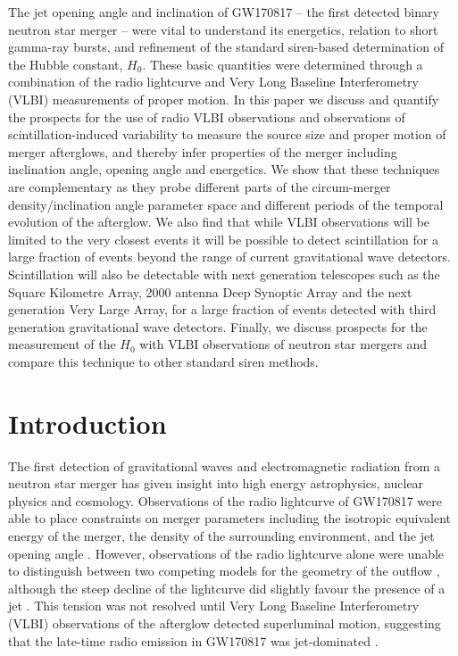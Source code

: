 \endgroup

The jet opening angle and inclination of GW170817 -- the first detected binary neutron star merger -- were vital to understand its energetics, relation to short gamma-ray bursts, and refinement of the standard siren-based determination of the Hubble constant, $H_0$. These basic quantities were determined through a combination of the radio lightcurve and Very Long Baseline Interferometry (VLBI) measurements of proper motion. In this paper we discuss and quantify the prospects for the use of radio VLBI observations and observations of scintillation-induced variability to measure the source size and proper motion of merger afterglows, and thereby infer properties of the merger including inclination angle, opening angle and energetics. We show that these techniques are complementary as they probe different parts of the circum-merger density/inclination angle parameter space and different periods of the temporal evolution of the afterglow. We also find that while VLBI observations will be limited to the very closest events it will be possible to detect scintillation for a large fraction of events beyond the range of current gravitational wave detectors. Scintillation will also be detectable with next generation telescopes such as the Square Kilometre Array, 2000 antenna Deep Synoptic Array and the next generation Very Large Array, for a large fraction of events detected with third generation gravitational wave detectors. Finally, we discuss prospects for the measurement of the $H_0$ with VLBI observations of neutron star mergers and compare this technique to other standard siren methods.

\section{Introduction}
The first detection of gravitational waves and electromagnetic radiation from a neutron star merger \citep[GW170817;][]{2017PhRvL.119p1101A,2017ApJ...848L..12A,2017ApJ...848L..13A} has given insight into high energy astrophysics, nuclear physics and cosmology. Observations of the radio lightcurve of GW170817 were able to place constraints on merger parameters including the isotropic equivalent energy of the merger, the density of the surrounding environment, and the jet opening angle \citep{2017Sci...358.1579H,2017ApJ...850L..21K,2018Natur.554..207M,2018ApJ...858L..15D,2018ApJ...863L..18A,2018ApJ...856L..18M,2018ApJ...868L..11M,2018ApJ...867...57R,2018MNRAS.478L..18T,2019MNRAS.489.1919T,2018ApJ...869...55W,2019ApJ...886L..17H,2019MNRAS.490.2822Z}. However, observations of the radio lightcurve alone were unable to distinguish between two competing models for the geometry of the outflow \citep{2018MNRAS.478..407N}, although the steep decline of the lightcurve did slightly favour the presence of a jet \citep{2018MNRAS.478L..18T,2018MNRAS.481.2581L}. This tension was not resolved until Very Long Baseline Interferometry (VLBI) observations of the afterglow detected superluminal motion, suggesting that the late-time radio emission in GW170817 was jet-dominated \citep{2018Natur.561..355M,2019Sci...363..968G}.

